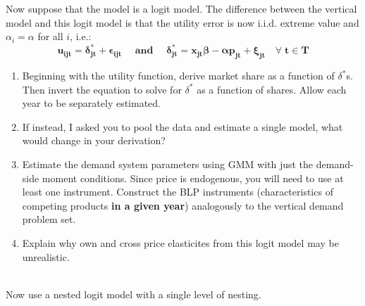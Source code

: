 \documentclass[12pt]{article}
\newcounter{mycounter} %
\begin{document}
\noindent
Now suppose that the model is a logit model. The difference between the vertical model and this logit model is that the utility error is now i.i.d. extreme value
and $\alpha _{i}=\alpha $ for all $i$, i.e.:
$$\symbf{u_{ijt}=\delta _{jt}^{\ast }+\epsilon _{ijt} \quad \text{ and } \quad \delta
_{jt}^{\ast }=x_{jt}\beta -\alpha p_{jt}+\xi _{jt} \quad \forall \; t \in T}$$
\begin{enumerate}
\item Beginning with the utility function, derive market share as a function of \(\delta^*\)s. Then invert the equation to solve for \(\delta^*\) as a function of shares. Allow each year to be separately estimated.

\item If instead, I asked you to pool the data and estimate a single model, what would change in your derivation?


\item \label{est:logit} Estimate the demand system parameters using GMM with just the demand-side moment conditions. Since price is endogenous, you will need to use at least one instrument. Construct the BLP instruments (characteristics of competing products \textbf{in a given year}) analogously to the vertical demand problem set.

\item Explain why own and cross price elasticites from this logit model may be unrealistic.
\setcounter{mycounter}{\value{enumi}}
\end{enumerate}
\mbox{} \\
\noindent
Now use a nested logit model with a single level of nesting. 
\end{document}
